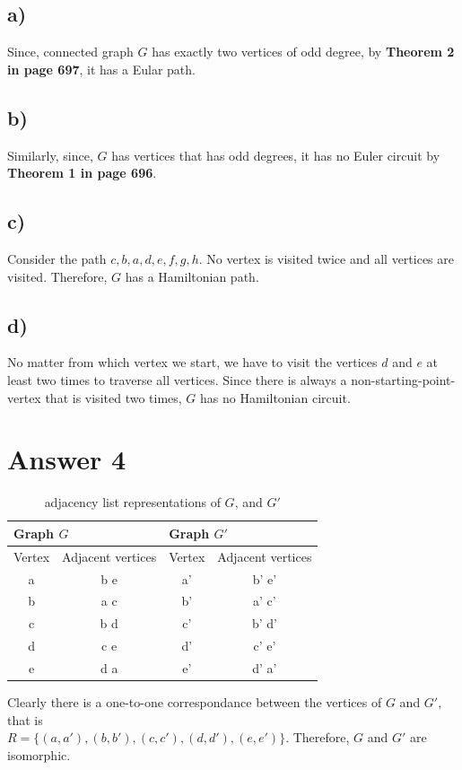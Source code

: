 \documentclass[11pt]{article}
\begin{document}
\subsection*{a)}
Since, connected graph $G$ has exactly two vertices of odd degree, by \textbf{Theorem 2 in page 697}, it has a Eular path.

\subsection*{b)}
Similarly, since, $G$ has vertices that has odd degrees, it has no Euler circuit by \textbf{Theorem 1 in page 696}.
\subsection*{c)}
Consider the path $c,b,a,d,e,f,g,h$. No vertex is visited twice and all vertices are visited. Therefore, $G$ has a Hamiltonian path.
\subsection*{d)}
No matter from which vertex we start, we have to visit the vertices $d$ and $e$ at least two times to traverse all vertices. Since there is always a non-starting-point-vertex that is visited two times, $G$ has no Hamiltonian circuit.


\section*{Answer 4}
\begin{table}[H]
    \centering
    \begin{tabular}{cc|cc}
        \multicolumn{2}{l|}{Graph $G$} & \multicolumn{2}{l}{Graph $G'$}\\
        \hline
        Vertex & Adjacent vertices & Vertex & Adjacent vertices\\
        \hline
         a & b e & a' & b' e' \\
         b & a c & b' & a' c' \\
         c & b d & c' & b' d' \\
         d & c e & d' & c' e' \\
         e & d a & e' & d' a' \\
    \end{tabular}
    \caption{adjacency list representations of $G$, and $G'$}
\end{table}
Clearly there is a one-to-one correspondance between the vertices of $G$ and $G'$, that is\\ $R=\{(a,a'),(b,b'),(c,c'),(d,d'),(e,e')\}$. Therefore, $G$ and $G'$ are isomorphic.
\end{document}
